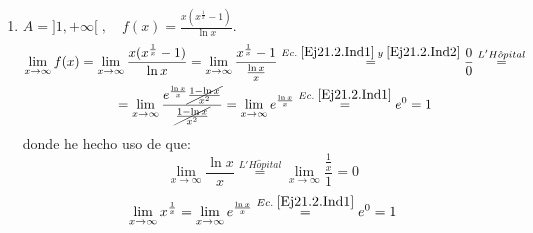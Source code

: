 \begin{ejercicio}
\begin{enumerate}
        \item $A = ]1, +\infty[\;,\quad f(x)=\frac{x(x^\frac{1}{x}-1)}{\ln{x}}$.
        \begin{multline*}
            \lim_{x\to \infty}f(x)
            = \lim_{x\to \infty}\frac{x(x^\frac{1}{x}-1)}{\ln{x}}
            = \lim_{x\to \infty}\frac{x^\frac{1}{x}-1}{\frac{\ln{x}}{x}}
            \stackrel{Ec.\;\ref{Ej21.2.Ind1}\; y\;\ref{Ej21.2.Ind2}}{=}\frac{0}{0} 
            \stackrel{L'H\hat{o}pital}{=}\\=
            \lim_{x\to \infty}\frac{e^{\frac{\ln{x}}{x}}\cancel{\frac{1-\ln{x}}{x^2}}}{\cancel{\frac{1-\ln{x}}{x^2}}}
            = \lim_{x\to \infty}e^{\frac{\ln{x}}{x}} \stackrel{Ec.\;\ref{Ej21.2.Ind1}}{=} e^0 = 1
        \end{multline*}
        donde he hecho uso de que:
        \begin{equation}\label{Ej21.2.Ind1}
            \lim_{x\to \infty} \frac{\ln{x}}{x} \stackrel{L'H\hat{o}pital}{=}
            \lim_{x\to \infty} \frac{\frac{1}{x}}{1} = 0 
        \end{equation}
        \begin{equation}\label{Ej21.2.Ind2}
            \lim_{x\to \infty} x^{\frac{1}{x}}
            = \lim_{x\to \infty} e^{\frac{\ln{x}}{x}} \stackrel{Ec.\;\ref{Ej21.2.Ind1}}{=} e^0 = 1
        \end{equation}
        

\end{enumerate}
\end{ejercicio}
